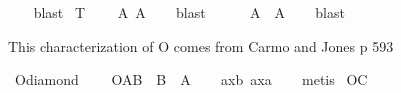 \begin{isabellebody}
%
\isadelimproof
\ \ %
\endisadelimproof
%
\isatagproof
{}\isamarkupfalse%
\ blast%
\endisatagproof
{\isafoldproof}%
%
\isadelimproof
\isanewline
%
\endisadelimproof
\isanewline
{}\isamarkupfalse%
\ T{\isacharcolon}\isanewline
\ \ \ {\isachardoublequoteopen}{\isasymTurnstile}\ {\isacharparenleft}{\isacharparenleft}{\isasymbox}A{\isacharparenright}\ \isactrlbold {\isasymrightarrow}A{\isacharparenright}{\isachardoublequoteclose}\isanewline
%
\isadelimproof
\ \ %
\endisadelimproof
%
\isatagproof
{}\isamarkupfalse%
\ blast%
\endisatagproof
{\isafoldproof}%
%
\isadelimproof
\isanewline
%
\endisadelimproof
\isanewline
{}\isamarkupfalse%
\ {}{\isacharcolon}\isanewline
\ \ \ {\isachardoublequoteopen}{\isasymTurnstile}\ {\isacharparenleft}{\isacharparenleft}{\isasymdiamond}A{\isacharparenright}\ \isactrlbold {\isasymrightarrow}\ {\isacharparenleft}{\isasymbox}{\isacharparenleft}{\isasymdiamond}A{\isacharparenright}{\isacharparenright}{\isacharparenright}{\isachardoublequoteclose}\isanewline
%
\isadelimproof
\ \ %
\endisadelimproof
%
\isatagproof
{}\isamarkupfalse%
\ blast%
\endisatagproof
{\isafoldproof}%
%
\isadelimproof
%
\endisadelimproof
%
\isadelimdocument
%
\endisadelimdocument
%
\isatagdocument
%
\isamarkuptrue%
%
\endisatagdocument
{\isafolddocument}%
%
\isadelimdocument
%
\endisadelimdocument
%
\begin{isamarkuptext}%
This characterization of O comes from Carmo and Jones p 593%
\end{isamarkuptext}\isamarkuptrue%
\isamarkupfalse%
\ O{\isacharunderscore}diamond{\isacharcolon}\isanewline
\ \ \ {\isachardoublequoteopen}{\isasymTurnstile}\ {\isacharparenleft}O{\isacharbraceleft}A{\isacharbar}B{\isacharbraceright}\ \isactrlbold {\isasymrightarrow}\ {\isacharparenleft}{\isasymdiamond}{\isacharparenleft}B\ \isactrlbold {\isasymand}\ A{\isacharparenright}{\isacharparenright}{\isacharparenright}{\isachardoublequoteclose}\isanewline
%
\isadelimproof
\ \ %
\endisadelimproof
%
\isatagproof
{}\isamarkupfalse%
\ ax{\isacharunderscore}{}b\ ax{\isacharunderscore}{}a\isanewline
\ \ \isamarkupfalse%
\ metis\isanewline
%
%
\endisatagproof
{\isafoldproof}%
%
\isadelimproof
\isanewline
%
\endisadelimproof
\isanewline
{}\isamarkupfalse%
\ O{\isacharunderscore}C{\isacharcolon}\isanewline

\end{isabellebody}
